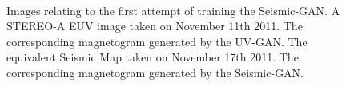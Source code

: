 \documentclass[11pt,a4paper,onecolumn]{report}
\begin{document}
\begin{figure}[t]%
  \centering
  \\%
  \caption[]{Images relating to the first attempt of training the Seismic-GAN.
   A STEREO-A EUV image taken on November 11th 2011.
   The corresponding magnetogram generated by the
  UV-GAN.  The equivalent Seismic Map taken on
  November 17th 2011.  The corresponding magnetogram
  generated by the Seismic-GAN.}
  \label{fig:default}
\end{figure}
\end{document}
